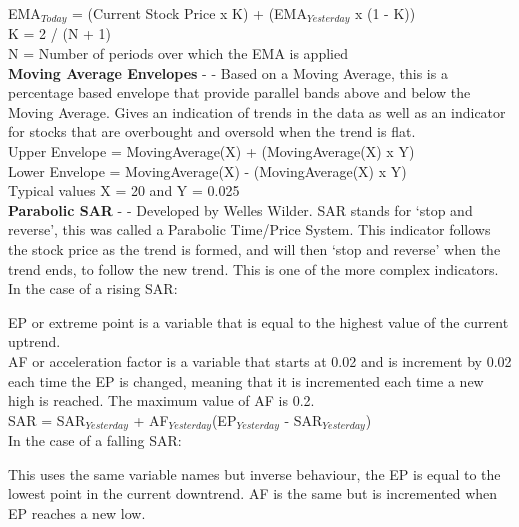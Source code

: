\documentclass[12pt,a4paper]{article}
\begin{document}
\noindent
EMA$_{Today}$ = (Current Stock Price x K) + (EMA$_{Yesterday}$ x (1 - K)) \\
K = 2 / (N + 1) \\
N = Number of periods over which the EMA is applied \\

\iffalse
[]
\fi

\noindent
\textbf{Moving Average Envelopes} - \cite{Murphy1999} - Based on a Moving Average, this is a percentage based envelope that provide parallel bands above and below the Moving Average. Gives an indication of trends in the data as well as an indicator for stocks that are overbought and oversold when the trend is flat.\\

\noindent
Upper Envelope = MovingAverage(X) + (MovingAverage(X) x Y)\\
Lower Envelope = MovingAverage(X) - (MovingAverage(X) x Y)\\
Typical values X = 20 and Y = 0.025\\

\iffalse
[]
\fi

\noindent
\textbf{Parabolic SAR} - \cite{Wilder1978} - Developed by Welles Wilder. SAR stands for `stop and reverse', this was called a Parabolic Time/Price System. This indicator follows the stock price as the trend is formed, and will then `stop and reverse' when the trend ends, to follow the new trend. This is one of the more complex indicators.\\

\noindent
In the case of a rising SAR:

\noindent
EP or extreme point is a variable that is equal to the highest value of the current uptrend.\\
AF or acceleration factor is a variable that starts at 0.02 and is increment by 0.02 each time the EP is changed, meaning that it is incremented each time a new high is reached. The maximum value of AF is 0.2. \\

\noindent
SAR = SAR$_{Yesterday}$ + AF$_{Yesterday}$(EP$_{Yesterday}$ - SAR$_{Yesterday}$) \\

\noindent
In the case of a falling SAR:

\noindent
This uses the same variable names but inverse behaviour, the EP is equal to the lowest point in the current downtrend. AF is the same but is incremented when EP reaches a new low. \\
\end{document}
